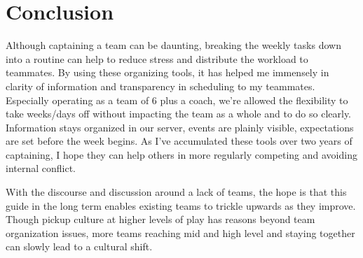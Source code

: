 \documentclass[12pt]{article}
\begin{document}
\section{Conclusion}
Although captaining a team can be daunting, breaking the weekly tasks down into a routine can help to reduce stress and distribute the workload to teammates. By using these organizing tools, it has helped me immensely in clarity of information and transparency in scheduling to my teammates. Especially operating as a team of 6 plus a coach, we're allowed the flexibility to take weeks/days off without impacting the team as a whole and to do so clearly. Information stays organized in our server, events are plainly visible, expectations are set before the week begins. As I've accumulated these tools over two years of captaining, I hope they can help others in more regularly competing and avoiding internal conflict. 

With the discourse and discussion around a lack of teams, the hope is that this guide in the long term enables existing teams to trickle upwards as they improve. Though pickup culture at higher levels of play has reasons beyond team organization issues, more teams reaching mid and high level and staying together can slowly lead to a cultural shift.
\end{document}
